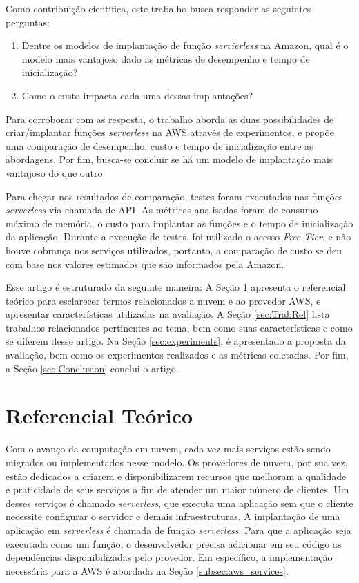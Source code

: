 \documentclass[conference]{IEEEtran}
\begin{document}
Como contribuição científica, este trabalho busca responder as seguintes perguntas:
\begin{enumerate}
  \item Dentre os modelos de implantação de função \textit{servierless} na Amazon, qual é o modelo mais vantajoso dado as métricas de desempenho e tempo de inicialização? 
  \item Como o custo impacta cada uma dessas implantações? 
\end{enumerate}

Para corroborar com as resposta, o trabalho aborda as duas possibilidades de criar/implantar funções \textit{serverless} na AWS através de experimentos, e propõe uma comparação de desempenho, custo e tempo de inicialização entre as abordagens. Por fim, busca-se concluir se há um modelo de implantação mais vantajoso do que outro.

Para chegar nos resultados de comparação, testes foram executados nas funções \textit{serverless} via chamada de API. As métricas analisadas foram de consumo máximo de memória, o custo para implantar as funções e o tempo de inicialização da aplicação. Durante a execução de testes, foi utilizado o acesso \textit{Free Tier}, e  não houve cobrança nos serviços utilizados, portanto, a comparação de custo se deu com base nos valores estimados que são informados pela Amazon.

Esse artigo é estruturado da seguinte maneira: A Seção \ref{sec:RefTeo} apresenta o referencial teórico para esclarecer termos relacionados a nuvem e ao provedor AWS, e apresentar características utilizadas na avaliação. A Seção \ref{sec:TrabRel} lista trabalhos relacionados pertinentes ao tema, bem como suas características e como se diferem desse artigo. Na Seção \ref{sec:experiments}, é apresentado a proposta da avaliação, bem como os experimentos realizados e as métricas coletadas. Por fim, a Seção \ref{sec:Conclusion} conclui o artigo.

\section{Referencial Teórico} 
\label{sec:RefTeo}

Com o avanço da computação em nuvem, cada vez mais serviços estão sendo migrados ou implementados nesse modelo. Os provedores de nuvem, por sua vez, estão dedicados a criarem e disponibilizarem recursos que melhoram a qualidade e praticidade de seus serviços a fim de atender um maior número de clientes. Um desses serviços é chamado \textit{serverless}, que executa uma aplicação sem que o cliente necessite configurar o servidor e demais infraestruturas. A implantação de uma aplicação em \textit{serverless} é chamada de função \textit{serverless}. Para que a aplicação seja executada como um função, o desenvolvedor precisa adicionar em seu código as dependências disponibilizadas pelo provedor. Em específico, a implementação necessária para a AWS é abordada na Seção \ref{subsec:aws_services}.
    
\end{document}
